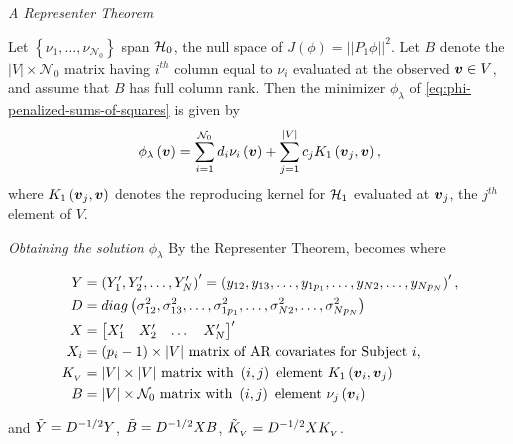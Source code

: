 \begin{frame}{\textit{A Representer Theorem}}{}

 \begin{theorem} \label{theorem:finite-dimensional-minimizer}
 Let $\left\{\nu_1,\dots, \nu_{\mathcal{N}_0}\right\}$ span $\mathcal{H}_0$, the null space of $J\left(\phi\right) = \vert \vert P_1 \phi\vert\vert^2$. Let $B$ denote the $\vert V \vert \times \mathcal{N}_0$ matrix having $i^{th}$ column equal to $\nu_i$ evaluated at the observed $\mbox{\boldmath $v$} \in V$, and assume that $B$ has full column rank. Then the minimizer $\phi_\lambda$ of \eqref{eq:phi-penalized-sums-of-squares} is given by
 \begin{equation} \label{eq:form-of-the-minimizer-phi}
\phi_\lambda\left(\mbox{\boldmath $v$}\right) = \sum_{i = 1}^{\mathcal{N}_0} d_i \nu_{i}\left(\mbox{\boldmath $v$}\right) + \sum_{j = 1}^{\vert V \vert} c_j K_1\left(\mbox{\boldmath $v$}_j, \mbox{\boldmath $v$}\right),
\end{equation}
\noindent
where $K_1\left(\mbox{\boldmath $v$}_j, \mbox{\boldmath $v$} \right)$ denotes the reproducing kernel for $\mathcal{H}_1$ evaluated at ${\mbox{\boldmath $v$}_j}$, the $j^{th}$ element of $V$.
\end{theorem}

\end{frame}


\begin{frame}{\textit{Obtaining the solution}  $\phi_\lambda$}
\footnotesize
By the Representer Theorem, \nt{\eqref{eq:phi-penalized-sums-of-squares}} becomes
\footnotesize
where
\begin{scriptsize}
\begin{align*}%
Y&= \left( Y'_1, Y'_2, \dots, Y'_{N} \right)' = \left( y_{12}, y_{13},\dots, y_{1p_1}, \dots, y_{N2},\dots, y_{Np_N} \right)', \\
D &= diag\left( \sigma^2_{12}, \sigma^2_{13},\dots, \sigma^2_{1p_1}, \dots,\sigma^2_{N2},\dots, \sigma^2_{Np_N}  \right)\\
X &= \begin{bmatrix} X'_1 &X'_2 &  \dots & X'_N \end{bmatrix}' \\
X_i &= \left(p_i-1\right) \times \vert V \vert \mbox{ matrix of AR covariates for Subject }i ,\\
K_{_{ V}} &= \vert V \vert \times \vert V \vert \mbox{ matrix with } \left(i,j\right) \mbox{ element } K_1\left(\bfv_i, \bfv_j\right)\\
B &= \vert V \vert \times \mathcal{N}_0 \mbox{ matrix with } \left(i,j\right) \mbox{ element } \nu_j\left(\bfv_i\right)
\end{align*} 
\end{scriptsize}
\footnotesize
and $\tilde{Y} = D^{-1/2} Y$, $\tilde{B} = D^{-1/2} X B $, $\tilde{K}_{_{ V}} = D^{-1/2} X K_{_{ V}}$.
\end{frame}


